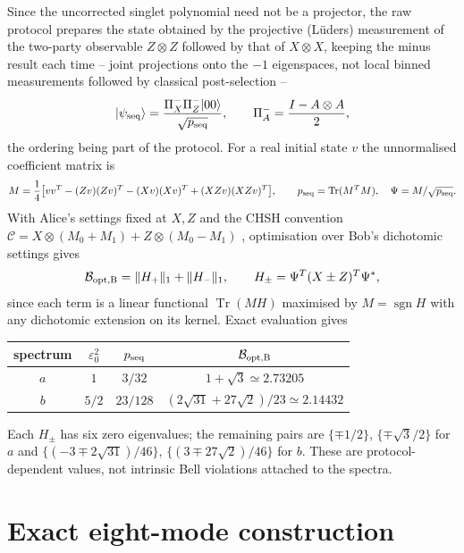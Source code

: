 \documentclass[11pt,a4paper]{article}
\newcommand{\sgn}{\operatorname{sgn}}
\newcommand{\Tr}{\operatorname{Tr}}
\newcommand{\ket}[1]{|#1\rangle}
\begin{document}
Since the uncorrected singlet polynomial need not be a projector, the raw protocol prepares the state obtained by the projective (L\"uders) measurement of the two-party observable $Z\otimes Z$ followed by that of $X\otimes X$, keeping the minus result each time -- joint projections onto the $-1$ eigenspaces, not local binned measurements followed by classical post-selection --
\begin{equation}
\ket{\psi_{\rm seq}}=\frac{\Pi^-_X\Pi^-_Z\ket{00}}{\sqrt{p_{\rm seq}}},\qquad \Pi^-_A=\frac{I-A\otimes A}2 ,
\end{equation}
the ordering being part of the protocol. For a real initial state $v$ the unnormalised coefficient matrix is
\begin{equation}
M=\frac14\big[vv^T-(Zv)(Zv)^T-(Xv)(Xv)^T+(XZv)(XZv)^T\big],\qquad p_{\rm seq}=\Tr(M^TM),\quad\Psi=M/\sqrt{p_{\rm seq}}.
\end{equation}
With Alice's settings fixed at $X,Z$ and the CHSH convention $\mathcal C=X\otimes(M_0+M_1)+Z\otimes(M_0-M_1)$ \cite{CHSH1969}, optimisation over Bob's dichotomic settings gives
\begin{equation}
\mathcal B_{\rm opt,B}=\|H_+\|_1+\|H_-\|_1,\qquad H_\pm=\Psi^T(X\pm Z)^T\Psi^*,
\end{equation}
since each term is a linear functional $\Tr(MH)$ maximised by $M=\sgn H$ with any dichotomic extension on its kernel. Exact evaluation gives
\begin{center}
\begin{tabular}{cccc}
\toprule
spectrum & $\varepsilon_0^2$ & $p_{\rm seq}$ & $\mathcal B_{\rm opt,B}$\\
\midrule
$a$ & $1$ & $3/32$ & $1+\sqrt3\simeq2.73205$\\
$b$ & $5/2$ & $23/128$ & $(2\sqrt{31}+27\sqrt2)/23\simeq2.14432$\\
\bottomrule
\end{tabular}
\end{center}
Each $H_\pm$ has six zero eigenvalues; the remaining pairs are $\{\mp1/2\}$, $\{\mp\sqrt3/2\}$ for $a$ and $\{(-3\mp2\sqrt{31})/46\}$, $\{(3\mp27\sqrt2)/46\}$ for $b$. These are protocol-dependent values, not intrinsic Bell violations attached to the spectra.

\section{Exact eight-mode construction}
\label{app:eight}
\end{document}

